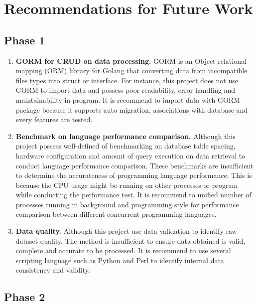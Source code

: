 \pagebreak

\section{Recommendations for Future Work}

\subsection{Phase 1}

\begin{enumerate}[topsep=0pt,itemsep=-1ex,partopsep=1ex,parsep=1.5ex]
	\item \textbf{GORM for CRUD on data processing.} GORM is an Object-relational mapping (ORM) library for Golang that converting data from incompatible files types into struct or interface. For instance, this project does not use GORM to import data and possess poor readability, error handling and maintainability in program. It is recommend to import data with GORM package because it supports auto migration, associations with database and every features are tested. 
	
	\item \textbf{Benchmark on language performance comparison.} Although this project possess well-defined of benchmarking on database table spacing, hardware configuration and amount of query execution on data retrieval to conduct language performance comparison. These benchmarks are insufficient to determine the accurateness of programming language performance. This is because the CPU usage might be running on other processes or program while conducting the performance test. It is recommend to unified number of processes running in background and programming style for performance comparison between different concurrent programming languages.
	
	\item \textbf{Data quality.} Although this project use data validation to identify raw dataset quality. The method is insufficient to ensure data obtained is valid, complete and accurate to be processed. It is recommend to use several scripting language such as Python and Perl to identify internal data consistency and validity.
	
\end{enumerate}

\pagebreak

\subsection{Phase 2}

